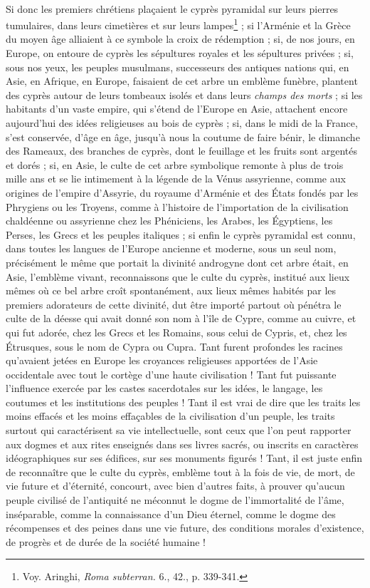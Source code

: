 \documentclass{article}
\begin{document}
\paragraph{}
Si donc les premiers chrétiens plaçaient le cyprès pyramidal sur leurs pierres tumulaires, dans leurs cimetières et sur leurs lampes\footnote{Voy. Aringhi, \emph{Roma subterran.} 6., 42., p. 339-341.} ; si l'Arménie et la Grèce du moyen âge alliaient à ce symbole la croix de rédemption ; si, de nos jours, en Europe, on entoure de cyprès les sépultures royales et les sépultures privées ; si, sous nos yeux, les peuples musulmans, successeurs des antiques nations qui, en Asie, en Afrique, en Europe, faisaient de cet arbre un emblème funèbre, plantent des cyprès autour de leurs tombeaux isolés et dans leurs \emph{champs des morts} ; si les habitants d'un vaste empire, qui s'étend de l'Europe en Asie, attachent encore aujourd'hui des idées religieuses au bois de cyprès ; si, dans le midi de la France, s'est conservée, d'âge en âge, jusqu'à nous la coutume de faire bénir, le dimanche des Rameaux, des branches de cyprès, dont le feuillage et les fruits sont argentés et dorés ; si, en Asie, le culte de cet arbre symbolique remonte à plus de trois mille ans et se lie intimement à la légende de la Vénus assyrienne, comme aux origines de l'empire d'Assyrie, du royaume d'Arménie et des États fondés par les Phrygiens ou les Troyens, comme à l'histoire de l'importation de la civilisation chaldéenne ou assyrienne chez les Phéniciens, les Arabes, les Égyptiens, les Perses, les Grecs et les peuples italiques ; si enfin le cyprès pyramidal est connu, dans toutes les langues de l'Europe ancienne et moderne, sous un seul nom, précisément le même que portait la divinité androgyne dont cet arbre était, en Asie, l'emblème vivant, reconnaissons que le culte du cyprès, institué aux lieux mêmes où ce bel arbre croît spontanément, aux lieux mêmes habités par les premiers adorateurs de cette divinité, dut être importé partout où pénétra le culte de la déesse qui avait donné son nom à l'île de Cypre, comme au cuivre, et qui fut adorée, chez les Grecs et les Romains, sous celui de Cypris, et, chez les Étrusques, sous le nom de Cypra ou Cupra. Tant furent profondes les racines qu'avaient jetées en Europe les croyances religieuses apportées de l'Asie occidentale avec tout le cortège d'une haute civilisation ! Tant fut puissante l'influence exercée par les castes sacerdotales sur les idées, le langage, les coutumes et les institutions des peuples ! Tant il est vrai de dire que les traits les moins effacés et les moins effaçables de la civilisation d'un peuple, les traits surtout qui caractérisent sa vie intellectuelle, sont ceux que l'on peut rapporter aux dogmes et aux rites enseignés dans ses livres sacrés, ou inscrits en caractères idéographiques sur ses édifices, sur ses monuments figurés ! Tant, il est juste enfin de reconnaître que le culte du cyprès, emblème tout à la fois de vie, de mort, de vie future et d'éternité, concourt, avec bien d'autres faits, à prouver qu'aucun peuple civilisé de l'antiquité ne méconnut le dogme de l'immortalité de l'âme, inséparable, comme la connaissance d'un Dieu éternel, comme le dogme des récompenses et des peines dans une vie future, des conditions morales d'existence, de progrès et de durée de la société humaine !
\end{document}
